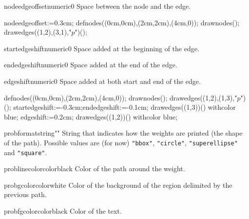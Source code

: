 \documentclass[11pt,a4paper,english]{article}
\begin{document}
\begin{mptparam}{nodeedgeoffset}{numeric}{0}
Space between the node and the edge.
\end{mptparam}

\begin{exemple}[lefthand ratio = 0.6]
nodeedgeoffset:=0.3cm;
defnodes((0cm,0cm),(2cm,2cm),(4cm,0));
drawnodes();
drawedges((1,2),(3,1),"$p$")();
\end{exemple}

\begin{mptparam}{startedgeshift}{numeric}{0}
Space added at the beginning of the edge.
\end{mptparam}

\begin{mptparam}{endedgeshift}{numeric}{0}
Space added at the end of the edge.
\end{mptparam}

\begin{mptparam}{edgeshift}{numeric}{0}
Space added at both start and end of the edge.
\end{mptparam}

\begin{exemple}[lefthand ratio = 0.6]
defnodes((0cm,0cm),(2cm,2cm),(4cm,0));
drawnodes();
drawedges((1,2),(1,3),"$p$")();
startedgeshift:=-0.3cm;endedgeshift:=-0.1cm;
drawedges((1,3))() withcolor blue;
edgeshift:=0.2cm;
drawedges((1,2))() withcolor blue;
\end{exemple}


\begin{mptparam}{probformat}{string}{""}
String that indicates how the weights are printed (the shape of the path). Possible values are (for now) \verb|"bbox"|, \verb|"circle"|, \verb|"superellipse"| and \verb|"square"|.

\end{mptparam}


\begin{mptparam}{problinecolor}{color}{black}
Color of the path around the weight.
\end{mptparam}

\begin{mptparam}{probgcolor}{color}{white}
Color of the background of the region delimited by the previous path.
\end{mptparam}

\begin{mptparam}{probfgcolor}{color}{black}
Color of the text.
\end{mptparam}
\end{document}
